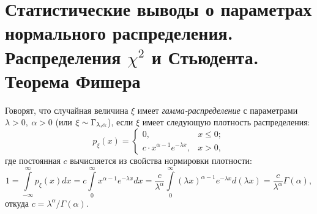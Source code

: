 \section{Статистические выводы о параметрах нормального распределения. Распределения \texorpdfstring{$\chi^{2}$}{хи-квадрат} и Стьюдента. Теорема Фишера}

\begin{defn}
    Говорят, что случайная величина $\xi$ имеет \textit{гамма-распределение} с параметрами $\lambda > 0,~ \alpha > 0$ (или $\xi \sim \operatorname{\Gamma}_{\lambda, \alpha}$), 
    если $\xi$ имеет следующую плотность распределения:
    \begin{equation*}
        p_{\xi}(x) = \begin{cases}
            0, & x \leqslant 0; \\
            c \cdot x^{\alpha-1} e^{-\lambda x}, & x > 0,
        \end{cases}
    \end{equation*}
    где постоянная $c$ вычисляется из свойства нормировки плотности:
    \begin{equation*}
        1 = 
        \int\limits_{-\infty}^{\infty} p_{\xi}(x) dx =
        c \int\limits_{0}^{\infty} x^{\alpha-1} e^{-\lambda x} dx =
        \frac{c}{\lambda^{\alpha}} \int\limits_{0}^{\infty}(\lambda x)^{\alpha-1} e^{-\lambda x} d(\lambda x) =
        \frac{c}{\lambda^{\alpha}} \Gamma(\alpha),
    \end{equation*}
    откуда $c=\lambda^{\alpha} / \Gamma(\alpha)$.
\end{defn}

